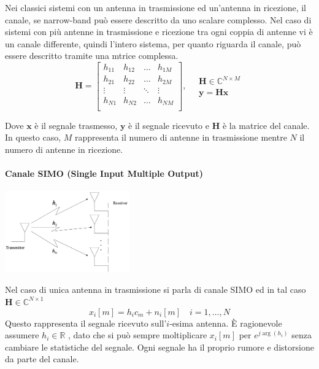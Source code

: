 Nei classici sistemi con un antenna in trasmissione ed un'antenna in ricezione, il canale, se narrow-band può essere descritto da uno scalare complesso.
Nel caso di sistemi con più antenne in trasmissione e ricezione tra ogni coppia di antenne vi è un canale differente, quindi l'intero sistema, per quanto riguarda il canale, può essere descritto tramite una mtrice complessa.
\[ 
    \mathbf{H} = 
    \begin{bmatrix}
        h_{11} & h_{12} & \ldots & h_{1M} \\
        h_{21} & h_{22} & \ldots & h_{2M} \\
        \vdots & \vdots & \ddots & \vdots \\
        h_{N1} & h_{N2} & \ldots & h_{NM} \\
    \end{bmatrix}
    , \quad
    \begin{array}{ll}
            \mathbf{H} \in \mathbb{C}^{N \times M} \\
            \mathbf{y} = \mathbf{Hx} 
    \end{array}
\]

Dove $\mathbf{x}$ è il segnale trasmesso, $\mathbf{y}$ è il segnale ricevuto e $\mathbf{H}$ è la matrice del canale. In questo caso, $M$ rappresenta il numero di antenne in trasmissione mentre $N$ il numero di antenne in ricezione.
\paragraph*{Canale SIMO (Single Input Multiple Output)}
\begin{center}
    \includegraphics[width=0.4\textwidth]{imgs/simo.jpg}
\end{center}
Nel caso di unica antenna in trasmissione si parla di canale SIMO ed in tal caso $\mathbf{H} \in \mathbb{C}^{N \times 1}$
\[
    x_i[m] = h_i c_m + n_i[m] \quad i = 1, \ldots, N
\]
Questo rappresenta il segnale ricevuto sull'$i$-esima antenna.
È ragionevole assumere $h_i \in \mathbb{R}$ , dato che si può sempre moltiplicare $x_i[m]$ per $ e^{j\arg(h_i)} $ senza cambiare le statistiche del segnale.
Ogni segnale ha il proprio rumore e distorsione da parte del canale.

